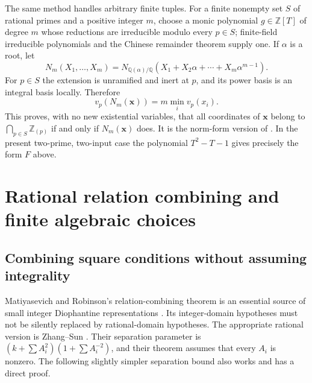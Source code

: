 \documentclass[11pt]{article}
\theoremstyle{definition}
\begin{document}
The same method handles arbitrary finite tuples. For a finite nonempty
set $S$ of rational primes and a positive integer $m$, choose a monic
polynomial $g\in\mathbb Z[T]$ of degree $m$ whose reductions are
irreducible modulo every $p\in S$; finite-field irreducible polynomials
and the Chinese remainder theorem supply one. If $\alpha$ is a root, let
\[
 N_m(X_1,\ldots,X_m)=
 N_{\mathbb Q(\alpha)/\mathbb Q}
 (X_1+X_2\alpha+\cdots+X_m\alpha^{m-1}).
\]
For $p\in S$ the extension is unramified and inert at $p$, and its
power basis is an integral basis locally. Therefore
\[
 v_p(N_m(\mathbf x))=m\min_i v_p(x_i).
\]
This proves, with no new existential variables, that all coordinates of
$\mathbf x$ belong to $\bigcap_{p\in S}\mathbb Z_{(p)}$ if and only if
$N_m(\mathbf x)$ does. It is the norm-form version of
\cite[Proposition 4.8]{Daans2024}. In the present two-prime, two-input
case the polynomial $T^2-T-1$ gives precisely the form $F$ above.



\section{Rational relation combining and finite algebraic choices}
\subsection{Combining square conditions without assuming integrality}

Matiyasevich and Robinson's relation-combining theorem is an essential
source of small integer Diophantine representations
\cite{MatiyasevichRobinson1975,Jones1982}. Its integer-domain hypotheses
must not be silently replaced by rational-domain hypotheses. The
appropriate rational version is Zhang--Sun
\cite[Theorem 1.2]{ZhangSun2022}. Their separation parameter is
$(k+\sum A_i^2)(1+\sum A_i^{-2})$, and their theorem assumes that every
$A_i$ is nonzero. The following slightly simpler separation bound also
works and has a direct proof.
\end{document}

